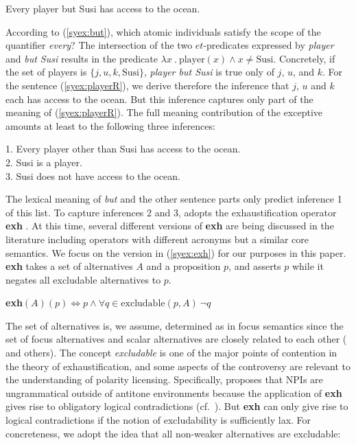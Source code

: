 \documentclass[output=paper,colorlinks,citecolor=brown,
]{langscibook}
\let\l\lambda
\begin{document}
\ea \label{syex:playerR} 
   Every player but Susi has access to the ocean.\z

According to (\ref{syex:but}), which atomic individuals satisfy the scope of the quantifier \emph{every}?
The intersection of the two $et$-predicates expressed by \emph{player} and \emph{but Susi} results in the predicate $\l x\ .\ \text{player}(x) \wedge x \neq \text{Susi}$.
Concretely, if the set of players is $\{j, u, k, \text{Susi}\}$, \emph{player but Susi} is true only of $j$, $u$, and $k$.  
For the sentence (\ref{syex:playerR}), we derive therefore the inference that $j$, $u$ and $k$ each has access to the ocean.
But this inference captures only part of the meaning of (\ref{syex:playerR}).
The full meaning contribution of the exceptive amounts at least to the following three inferences:

\ea \label{syex:inferences}
    1. Every player other than Susi has access to the ocean.\\
    2. Susi is a player.\\
    3. Susi does not have access to the ocean. \z

The lexical meaning of \emph{but} and the other sentence parts only predict inference 1 of this list.
To capture inferences 2 and 3, \cite{hirsch16b} adopts the exhaustification operator \textbf{exh} \citep{chierchia13a,fox07b}.
At this time, several different versions of \textbf{exh} are being discussed in the literature including operators with different acronyms but a similar core semantics.
We focus on the version in (\ref{syex:exh}) for our purposes in this paper.
\textbf{exh} takes a set of alternatives $A$ and a proposition $p$, and asserts $p$ while it negates all excludable alternatives to $p$.

\ea \label{syex:exh}
\textbf{exh}$(A)(p) \Leftrightarrow p \land \forall q \in \text{excludable}(p,A) \ \neg q$\z

The set of alternatives is, we assume, determined as in focus semantics since the set of focus alternatives and scalar alternatives are closely related to each other (\citealt{gotzner19a} and others).
The concept \emph{excludable} is one of the major points of contention in the theory of exhaustification, and some aspects of the controversy are relevant to the understanding of polarity licensing.
Specifically, \cite{chierchia13a} proposes that NPIs are ungrammatical outside of antitone environments because the application of \textbf{exh} gives rise to obligatory logical contradictions (cf.\ \citealt{crnic14a}).
But \textbf{exh} can only give rise to logical contradictions if the notion of excludability is sufficiently lax.
For concreteness, we adopt the idea that all non-weaker alternatives are excludable:
\end{document}
